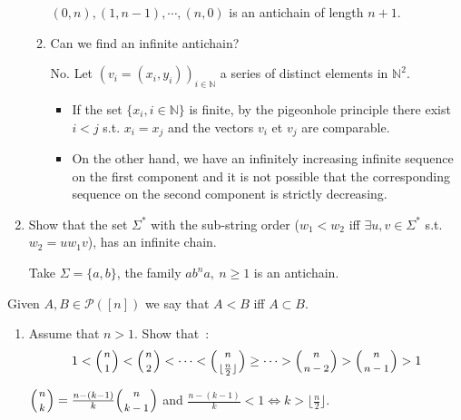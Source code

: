 \documentclass[a4paper,11pt]{exam}
\renewcommand{\binom}{\mbinom}
\newcommand{\N}{\mathbb{N}}
\begin{document}
\begin{questions}
\begin{enumerate}
\begin{enumerate}
          \begin{solution}
            $(0,n), (1,n-1), \cdots, (n,0)$ is an antichain of length $n+1$.
          \end{solution}

        \item Can we find an infinite  antichain?

          \begin{solution}
            No.
            Let $(v_i = (x_i, y_i))_{i \in \N}$ a series of distinct elements in $\N^2$.
            \begin{itemize}
              \item If the set $\{ x_i, i \in \N \}$ is finite, by the pigeonhole principle there exist $i<j$ s.t. $x_i = x_j$ and the vectors $v_i$ et $v_j$ are comparable.
              \item On the other hand, we have an infinitely increasing infinite sequence on the first component and it is not possible that the corresponding sequence on the second component is strictly decreasing.
            \end{itemize}
          \end{solution}
      \end{enumerate}

    \item Show that the set $\Sigma^* $ with the sub-string order ($w_1<w_2 $ iff $ \exists u,v\in\Sigma^* $ s.t. $ w_2 = uw_1v$), has an infinite chain.
   
      \begin{solution}
        Take $\Sigma = \{ a,b \}$,
		the family $ab^na,~ n \geq 1$ is an antichain.
      \end{solution}
  \end{enumerate}

\question Given $A,B\in\mathcal{P}([n])$ we say that $A<B$ iff $A\subset B$. 



  \begin{enumerate}
    \item Assume that $n>1$. 
      Show that~:
      \[
        1 < \binom{n}{1} < \binom{n}{2} < \cdots <
        \binom{n}{\lfloor \frac{n}{2}\rfloor} \geq \cdots >
        \binom{n}{n-2} > \binom{n}{n-1} > 1
      \]

      \begin{solution}
        $\binom{n}{k} = \frac{n-(k-1)}{k}\binom{n}{k-1}$ and
        $\frac{n-(k-1)}{k} < 1 \iff k > \lfloor \frac{n}{2} \rfloor$.
      \end{solution}


\end{enumerate}
\end{questions}
\end{document}
